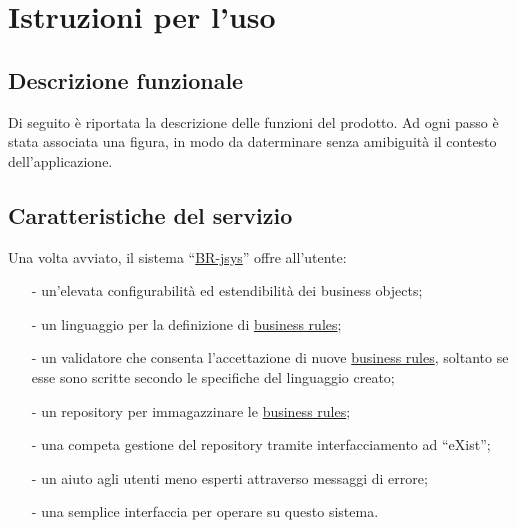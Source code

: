 \chapter{Istruzioni per l'uso}
\section{Descrizione funzionale}
Di seguito \`e riportata la descrizione delle funzioni del prodotto. Ad ogni passo \`e stata associata una figura, in modo da daterminare senza amibiguit\`a il contesto dell'applicazione.

\section{Caratteristiche del servizio}
Una volta avviato, il sistema ``\underline{BR-jsys}'' offre all'utente:
\begin{itemize}
\item[-] un'elevata configurabilit\`a ed estendibilit\`a dei business objects;
\item[-] un linguaggio per la definizione di \underline{business rules};
\item[-] un validatore che consenta l'accettazione di nuove \underline{business rules}, soltanto se esse sono scritte secondo le specifiche del linguaggio creato;
\item[-] un repository per immagazzinare le \underline{business rules};
\item[-] una competa gestione del repository tramite interfacciamento ad ``eXist'';
\item[-] un aiuto agli utenti meno esperti attraverso  messaggi di errore;
\item[-] una semplice interfaccia per operare su questo sistema.
\end{itemize}


